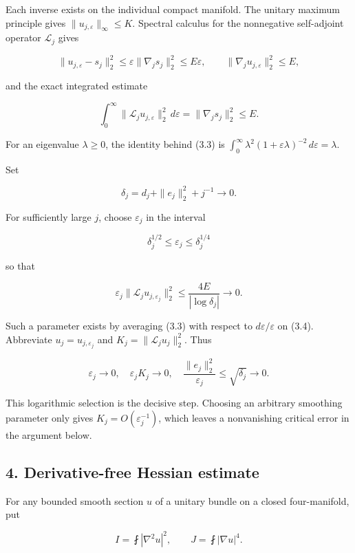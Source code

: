 \documentclass[11pt]{article}
\begin{document}
Each inverse exists on the individual compact manifold. The unitary
maximum principle gives \(\|u_{j,\varepsilon}\|_\infty\le K\). Spectral
calculus for the nonnegative self-adjoint operator \(\mathcal L_j\)
gives

\[
\|u_{j,\varepsilon}-s_j\|_2^2
\le\varepsilon\|\nabla_j s_j\|_2^2\le E\varepsilon,
\qquad
\|\nabla_j u_{j,\varepsilon}\|_2^2\le E,
\tag{D.3.2}
\]

and the exact integrated estimate

\[
\int_0^\infty\|\mathcal L_j u_{j,\varepsilon}\|_2^2\,d\varepsilon
=\|\nabla_j s_j\|_2^2\le E.
\tag{D.3.3}
\]

For an eigenvalue \(\lambda\ge0\), the identity behind (3.3) is
\(\int_0^\infty \lambda^2(1+\varepsilon\lambda)^{-2}\,d\varepsilon=\lambda\).

Set

\[
\delta_j=d_j+\|e_j\|_2^2+j^{-1}\longrightarrow0.
\]

For sufficiently large \(j\), choose \(\varepsilon_j\) in the interval

\[
\delta_j^{1/2}\le\varepsilon_j\le\delta_j^{1/4}
\tag{D.3.4}
\]

so that

\[
\varepsilon_j\|\mathcal L_j u_{j,\varepsilon_j}\|_2^2
\le\frac{4E}{|\log\delta_j|}\longrightarrow0.
\tag{D.3.5}
\]

Such a parameter exists by averaging (3.3) with respect to
\(d\varepsilon/\varepsilon\) on (3.4). Abbreviate
\(u_j=u_{j,\varepsilon_j}\) and \(K_j=\|\mathcal L_j u_j\|_2^2\). Thus

\[
\varepsilon_j\to0,\quad
\varepsilon_jK_j\to0,\quad
\frac{\|e_j\|_2^2}{\varepsilon_j}\le\sqrt{\delta_j}\to0.
\tag{D.3.6}
\]

This logarithmic selection is the decisive step. Choosing an arbitrary
smoothing parameter only gives \(K_j=O(\varepsilon_j^{-1})\), which
leaves a nonvanishing critical error in the argument below.

\hypertarget{derivative-free-hessian-estimate}{%
\subsection{4. Derivative-free Hessian
estimate}\label{derivative-free-hessian-estimate}}

For any bounded smooth section \(u\) of a unitary bundle on a closed
four-manifold, put

\[
I=\fint|\nabla^2u|^2,\qquad J=\fint|\nabla u|^4.
\]
\end{document}
